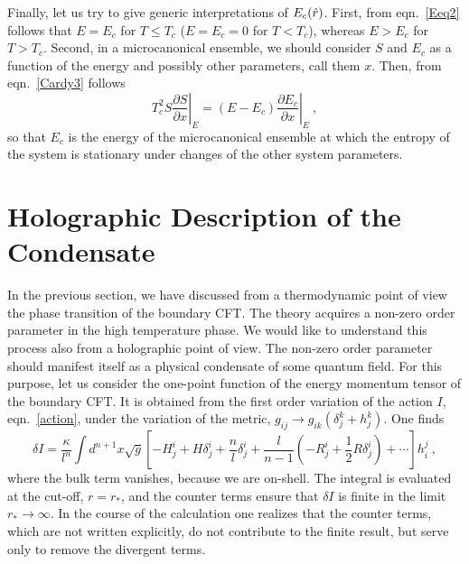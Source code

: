 \documentclass[a4paper,12pt]{article}
\begin{document}
Finally, let us try to give generic interpretations of
$E_c(\hat{r})$. First, from eqn.\ \eqref{Eeq2} follows that
$E=E_c$ for $T\le T_c$ ($E=E_c=0$ for $T<T_c$), whereas $E>E_c$ for
$T>T_c$. Second, in a microcanonical ensemble, we should
consider $S$ and $E_c$  as a function of the energy and possibly other
parameters, call them $x$. Then, from eqn.\ \eqref{Cardy3} follows
\begin{equation}
\label{Ec_interpret}
  T_c^2 S \left.\frac{\partial S}{\partial x}\right|_E
  = (E-E_c) \left.\frac{\partial E_c}{\partial x}\right|_E~,
\end{equation}
so that $E_c$ is the energy of the microcanonical ensemble at which the
entropy of the system is stationary under changes of the other system
parameters.



\section{Holographic Description of the Condensate}
\label{onepoint}
In the previous section, we have discussed from a thermodynamic point
of view the phase transition of the boundary CFT. The theory acquires
a non-zero order parameter in the high temperature phase.
We would like to understand this process also from a holographic point
of view. The non-zero order parameter should manifest itself as a
physical condensate of some quantum field.
For this purpose, let us consider the one-point function of
the energy momentum tensor of the boundary CFT.
It is obtained from the first order variation of the action $I$,
eqn.\ \eqref{action}, under the variation of the metric,
$g_{ij}\to g_{ik}(\delta^k_j +h^k_j)$. One finds
\begin{equation}
\label{dI}
  \delta I = \frac{\kappa}{l^n} \int d^{n+1} x \sqrt{g} \left[ -H^i_j
  +H \delta^i_j +\frac{n}{l} \delta^i_j + \frac{l}{n-1} \left( -R^i_j
  + \frac12 R \delta^i_j \right) + \cdots \right] h^j_i~,
\end{equation}
where the bulk term vanishes, because we are on-shell.
The integral is evaluated at the cut-off, $r=r_\ast$, and the counter
terms ensure that $\delta I$ is finite in the limit $r_\ast\to
\infty$. In the course of the calculation one realizes that the
counter terms, which are not written explicitly, do not contribute to
the finite result, but serve only to remove the divergent terms.
\end{document}
